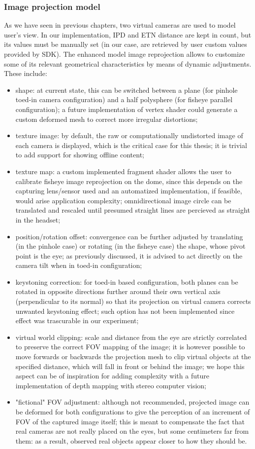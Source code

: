 \subsubsection{Image projection model}
As we have seen in previous chapters, two virtual cameras are used to model user’s view. In our implementation, IPD and ETN distance are kept in count, but its values must be manually set (in our case, are retrieved by user custom values provided by SDK). The enhanced model image reprojection allows to customize some of its relevant geometrical characteristics by means of dynamic adjustments. These include:
\begin{itemize}
\item shape: at current state, this can be switched between a plane (for pinhole toed-in camera configuration) and a half polysphere (for fisheye parallel configuration); a future implementation of vertex shader could generate a custom deformed mesh to correct more irregular distortions;
\item texture image: by default, the raw or computationally undistorted image of each camera is displayed, which is the critical case for this thesis; it is trivial to add support for showing offline content;
\item texture map: a custom implemented fragment shader allows the user to calibrate fisheye image reprojection on the dome, since this depends on the capturing lens/sensor used and an automatized implementation, if feasible, would arise application complexity; omnidirectional image circle can be translated and rescaled until presumed straight lines are percieved as straight in the headset;
\item position/rotation offset: convergence can be further adjusted by translating (in the pinhole case) or rotating (in the fisheye case) the shape, whose pivot point is the eye; as previously discussed, it is advised to act directly on the camera tilt when in toed-in configuration;
\item keystoning correction: for toed-in based configuration, both planes can be rotated in opposite directions further around their own vertical axis (perpendicular to its normal) so that its projection on virtual camera corrects unwanted keystoning effect; such option has not been implemented since effect was trascurable in our experiment;
\item virtual world clipping: scale and distance from the eye are strictly correlated to preserve the correct FOV mapping of the image; it is however possible to move forwards or backwards the projection mesh to clip virtual objects at the specified distance, which will fall in front or behind the image; we hope this aspect can be of inspiration for adding complexity with a future implementation of depth mapping with stereo computer vision;
\item "fictional" FOV adjustment: although not recommended, projected image can be deformed for both configurations to give the perception of an increment of FOV of the captured image itself; this is meant to compensate the fact that real cameras are not really placed on the eyes, but some centimeters far from them: as a result, observed real objects appear closer to how they should be.
\end{itemize}


